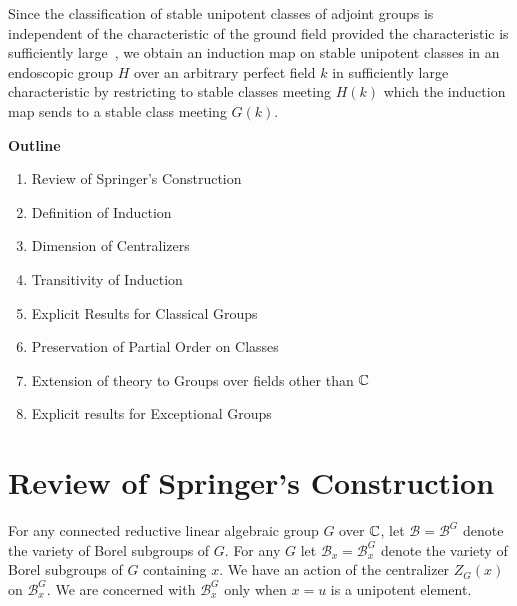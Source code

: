 \documentclass{amsart}
\newcommand\bB{{\mathcal B}}
\newcommand\C		{{\Bbb C}}
\begin{document}
Since the classification of stable unipotent classes of adjoint
groups is 
independent of the
characteristic of the ground field provided the characteristic is
sufficiently
large~\cite{C}, we
obtain an induction map on stable unipotent classes in an
endoscopic group
$H$ over an arbitrary perfect field $k$ in sufficiently large
characteristic 
by restricting
to stable classes meeting $H(k)$ which the induction map sends to
a stable 
class meeting $G(k)$.


\centerline{\bf Outline}

\bigskip

\begin{enumerate}[label=\arabic*.]
\item Review of Springer's Construction
\item Definition of Induction
\item Dimension of Centralizers
\item Transitivity of Induction
\item Explicit Results for Classical
Groups
\item Preservation of Partial Order on
Classes
\item Extension of theory to Groups over fields
other than $\C$%
\item Explicit results for Exceptional
Groups
\end{enumerate}

\section{Review of Springer's Construction} %

\bigskip

For any connected reductive linear algebraic group $G$ over $\C$,
let 
$\bB = \bB^G$ denote the variety of Borel subgroups of $G$.  For
any $G$ let
$\bB_x = \bB_x^G$ denote the variety of Borel subgroups of $G$
containing $x$.
We have an action of the centralizer $Z_G(x)$ on $\bB_x^G$.  We
are concerned
with $\bB_x^G$ only when $x = u$ is a unipotent element.
\end{document}
